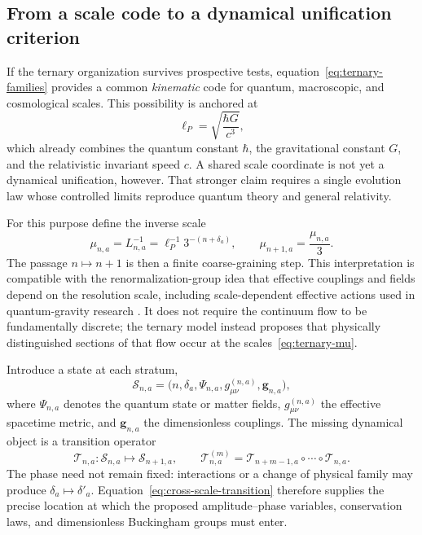 \documentclass[11pt]{amsart}
\theoremstyle{definition}
\theoremstyle{remark}
\begin{document}
\subsection{From a scale code to a dynamical unification criterion}\label{subsec:unification}
If the ternary organization survives prospective tests, equation~\eqref{eq:ternary-families}
provides a common \emph{kinematic} code for quantum, macroscopic, and cosmological scales.  This
possibility is anchored at
\begin{equation}\label{eq:planck-bridge}
  \ell_P=\sqrt{\frac{\hbar G}{c^3}},
\end{equation}
which already combines the quantum constant $\hbar$, the gravitational constant $G$, and the
relativistic invariant speed $c$.  A shared scale coordinate is not yet a dynamical unification,
however.  That stronger claim requires a single evolution law whose controlled limits reproduce
quantum theory and general relativity.

For this purpose define the inverse scale
\begin{equation}\label{eq:ternary-mu}
  \mu_{n,a}=L_{n,a}^{-1}=\ell_P^{-1}3^{-(n+\delta_a)},
  \qquad \mu_{n+1,a}=\frac{\mu_{n,a}}{3}.
\end{equation}
The passage $n\mapsto n+1$ is then a finite coarse-graining step.  This interpretation is
compatible with the renormalization-group idea that effective couplings and fields depend on the
resolution scale, including scale-dependent effective actions used in quantum-gravity research
\cite{Reuter1998,Donoghue1994,Ambjorn2024}.  It does not require the continuum flow to be
fundamentally discrete; the ternary model instead proposes that physically distinguished sections
of that flow occur at the scales~\eqref{eq:ternary-mu}.

Introduce a state at each stratum,
\begin{equation}\label{eq:cross-scale-state}
  \mathcal S_{n,a}
  =\bigl(n,\delta_a,\Psi_{n,a},g^{(n,a)}_{\mu\nu},\mathbf g_{n,a}\bigr),
\end{equation}
where $\Psi_{n,a}$ denotes the quantum state or matter fields,
$g^{(n,a)}_{\mu\nu}$ the effective spacetime metric, and $\mathbf g_{n,a}$ the dimensionless
couplings.  The missing dynamical object is a transition operator
\begin{equation}\label{eq:cross-scale-transition}
  \mathcal T_{n,a}:\mathcal S_{n,a}\longmapsto\mathcal S_{n+1,a},
  \qquad
  \mathcal T^{(m)}_{n,a}
  =\mathcal T_{n+m-1,a}\circ\cdots\circ\mathcal T_{n,a}.
\end{equation}
The phase need not remain fixed: interactions or a change of physical family may produce
$\delta_a\mapsto\delta'_a$.  Equation~\eqref{eq:cross-scale-transition} therefore supplies the
precise location at which the proposed amplitude--phase variables, conservation laws, and
dimensionless Buckingham groups must enter.
\end{document}
